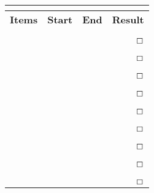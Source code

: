 \documentclass[12pt, a4paper]{article}
\begin{document}
\begin{autofilo}{}
\begin{table}[ht!]
\centering
\begin{tabular}{lllr}
{\bf \phantom{xxxxxxx}}&{\bf \phantom{xxxxxx}}%
&{\bf \phantom{xxxxxx}}&{\bf \phantom{xxxx}}\\
\hline
\hline
{\bf Items}&{\bf Start}&{\bf End}&{\bf Result}\\ \hline
{$\;$}\\
{$\;$}\\
{$\;$}&{$\;$}&{$\;$}&{\bf $\boxempty$}\\ \hline
{$\;$}\\
{$\;$}\\
{$\;$}&{$\;$}&{$\;$}&{\bf $\boxempty$}\\ \hline
{$\;$}\\
{$\;$}\\
{$\;$}&{$\;$}&{$\;$}&{\bf $\boxempty$}\\ \hline
{$\;$}\\
{$\;$}\\
{$\;$}&{$\;$}&{$\;$}&{\bf $\boxempty$}\\ \hline
{$\;$}\\
{$\;$}\\
{$\;$}&{$\;$}&{$\;$}&{\bf $\boxempty$}\\ \hline
{$\;$}\\
{$\;$}\\
{$\;$}&{$\;$}&{$\;$}&{\bf $\boxempty$}\\ \hline
{$\;$}\\
{$\;$}\\
{$\;$}&{$\;$}&{$\;$}&{\bf $\boxempty$}\\ \hline
{$\;$}\\
{$\;$}\\
{$\;$}&{$\;$}&{$\;$}&{\bf $\boxempty$}\\ \hline
{$\;$}\\
{$\;$}\\
{$\;$}&{$\;$}&{$\;$}&{\bf $\boxempty$}\\ \hline
\hline
\end{tabular}
\end{table}
\end{autofilo}

\bigskip
\end{document}
